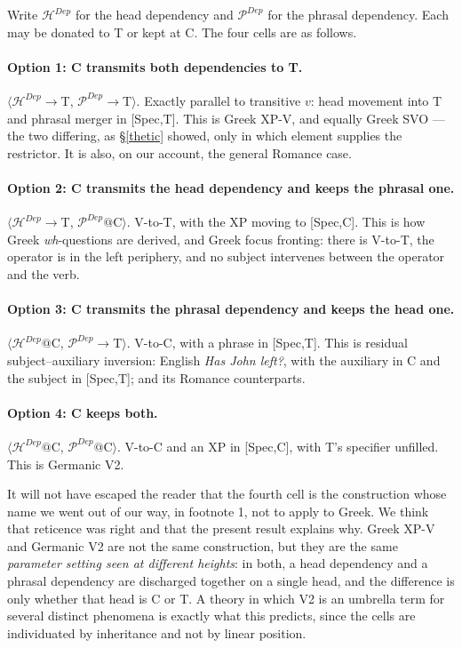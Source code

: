 \documentclass[11pt]{article}
\newcommand{\Hd}{{$\mathcal{H}^{Dep}$}\xspace}
\newcommand{\Pd}{{$\mathcal{P}^{Dep}$}\xspace}
\begin{document}
Write \Hd{} for the head dependency and \Pd{} for the phrasal dependency.  Each may be donated to T or kept at C.  The four cells are as follows.

\paragraph*{Option 1: C transmits both dependencies to T.} $\langle$\Hd$\to$T, \Pd$\to$T$\rangle$.  Exactly parallel to transitive $v$: head movement into T and phrasal merger in [Spec,T].  This is Greek XP-V, and equally Greek SVO --- the two differing, as \S\ref{thetic} showed, only in which element supplies the restrictor.  It is also, on our account, the general Romance case.

\paragraph*{Option 2: C transmits the head dependency and keeps the phrasal one.} $\langle$\Hd$\to$T, \Pd$@$C$\rangle$.  V-to-T, with the XP moving to [Spec,C].  This is how Greek \emph{wh}-questions are derived, and Greek focus fronting: there is V-to-T, the operator is in the left periphery, and no subject intervenes between the operator and the verb.

\paragraph*{Option 3: C transmits the phrasal dependency and keeps the head one.} $\langle$\Hd$@$C, \Pd$\to$T$\rangle$.  V-to-C, with a phrase in [Spec,T].  This is residual subject--auxiliary inversion: English \emph{Has John left?}, with the auxiliary in C and the subject in [Spec,T]; and its Romance counterparts.

\paragraph*{Option 4: C keeps both.} $\langle$\Hd$@$C, \Pd$@$C$\rangle$.  V-to-C and an XP in [Spec,C], with T's specifier unfilled.  This is Germanic V2.

\medskip
It will not have escaped the reader that the fourth cell is the construction whose name we went out of our way, in footnote 1, not to apply to Greek.  We think that reticence was right and that the present result explains why.  Greek XP-V and Germanic V2 are not the same construction, but they are the same \emph{parameter setting seen at different heights}: in both, a head dependency and a phrasal dependency are discharged together on a single head, and the difference is only whether that head is C or T.  A theory in which V2 is an umbrella term for several distinct phenomena \citep{holmberg:13, jouitteau:07} is exactly what this predicts, since the cells are individuated by inheritance and not by linear position.
\end{document}
